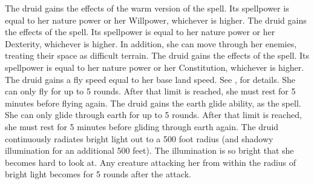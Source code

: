 The druid gains the effects of the warm version of the  spell.
Its spellpower is equal to her nature power or her Willpower, whichever is higher.
 The druid gains the effects of the  spell.
Its spellpower is equal to her nature power or her Dexterity, whichever is higher.
In addition, she can move through her enemies, treating their space as difficult terrain.
 The druid gains the effects of the  spell.
Its spellpower is equal to her nature power or her Constitution, whichever is higher.
 The druid gains a fly speed equal to her base land speed.
See , for details.
She can only fly for up to 5 rounds.
After that limit is reached, she must rest for 5 minutes before flying again.
The druid gains the earth glide ability, as the  spell.
She can only glide through earth for up to 5 rounds.
After that limit is reached, she must rest for 5 minutes before gliding through earth again.
The druid continuously radiates bright light out to a 500 foot radius (and shadowy illumination for an additional 500 feet).
The illumination is so bright that she becomes hard to look at.
Any creature attacking her from within the radius of bright light becomes \partiallyblinded for 5 rounds after the attack.

